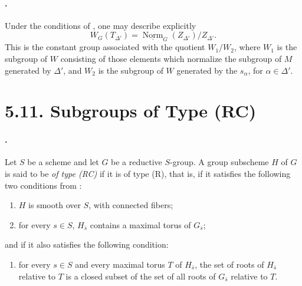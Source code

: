 \paragraph{.}
Under the conditions of , one may describe explicitly
\[
  W_G(T_{\Delta'})
  =
  \underline{\operatorname{Norm}}_G(Z_{\Delta'})/Z_{\Delta'}.
\]
This is the constant group associated with the quotient \(W_1/W_2\),
where \(W_1\) is the subgroup of \(W\) consisting of those elements
which normalize the subgroup of \(M\) generated by \(\Delta'\), and
\(W_2\) is the subgroup of \(W\) generated by the \(s_\alpha\), for
\(\alpha\in\Delta'\).

\section*{5.11. Subgroups of Type \textup{(RC)}}

\paragraph{.}
Let \(S\) be a scheme and let \(G\) be a reductive \(S\)-group. A
group subscheme \(H\) of \(G\) is said to be \emph{of type
\textup{(RC)}} if it is of type \textup{(R)}, that is, if it
satisfies the following two conditions from :
\begin{enumerate}
\item[\textup{(i)}] \(H\) is smooth over \(S\), with connected
fibers;

\item[\textup{(ii)}] for every \(s\in S\), \(H_{\bar s}\) contains
a maximal torus of \(G_{\bar s}\);
\end{enumerate}
and if it also satisfies the following condition:
\begin{enumerate}
\item[\textup{\SGAInlineRefTarget{sga3:xxii:def:5.11.1:item:iii}(iii)}] for every \(s\in S\) and every maximal torus
\(T\) of \(H_{\bar s}\), the set of roots of \(H_{\bar s}\)
relative to \(T\) is a closed subset of the set of all roots of
\(G_{\bar s}\) relative to \(T\).
\end{enumerate}


